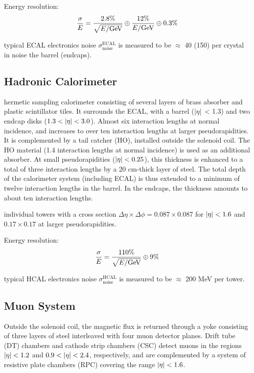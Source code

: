 Energy resolution:
\begin{equation}
\label{eqn:ecal_res}
\frac{\sigma}{E} = \frac{2.8\%}{\sqrt{E/\mathrm{GeV}}} \oplus \frac{12\%}{E/\mathrm{GeV}} \oplus 0.3\%
\end{equation}

typical ECAL electronics noise $\sigma ^{\text{ECAL}} _{\text{noise}}$ is measured to be $\approx$ 40 (150) \MeV per crystal in noise the barrel (endcaps).


\subsection{Hadronic Calorimeter}

hermetic sampling calorimeter consisting of several layers of brass absorber and plastic scintillator tiles. It surrounds the ECAL, with a barrel ($\lvert\eta\rvert$ < 1.3) and two endcap disks ($1.3 < \lvert\eta\rvert < 3.0$).
Almost six interaction lengths at normal incidence, and increases to over ten interaction lengths at larger pseudorapidities.
It is complemented by a tail catcher (HO), installed outside the solenoid coil. The HO material 
(1.4 interaction lengths at normal incidence) is used as an additional absorber. At small pseudorapidities ($\lvert\eta\rvert < 0.25$), 
this thickness is enhanced to a total of three interaction lengths by a 20 cm-thick layer of steel. 
The total depth of the calorimeter system (including ECAL) is thus extended to a minimum of 
twelve interaction lengths in the barrel. In the endcaps, the thickness amounts to about ten interaction lengths.

individual towers with a cross section $\Delta\eta \times \Delta\phi = 0.087 \times 0.087$ for $\lvert\eta\rvert < 1.6$ 
and $0.17 \times 0.17$ at larger pseudorapidities.

Energy resolution:
\begin{equation}
\label{eqn:hcal_res}
\frac{\sigma}{E} = \frac{110\%}{\sqrt{E/\mathrm{GeV}}} \oplus 9\%
\end{equation}

typical HCAL electronics noise $\sigma ^{\text{HCAL}} _{\text{noise}}$ is measured to be $\approx$ 200 MeV per tower.

\subsection{Muon System}

Outside the solenoid coil, the magnetic flux is returned through a yoke consisting of three 
layers of steel interleaved with four muon detector planes. Drift tube (DT) chambers and 
cathode strip chambers (CSC) detect muons in the regions $\lvert\eta\rvert < 1.2$ and $0.9 < \lvert\eta\rvert < 2.4$, 
respectively, and are complemented by a system of resistive plate chambers (RPC) covering the range $\lvert\eta\rvert < 1.6$.

